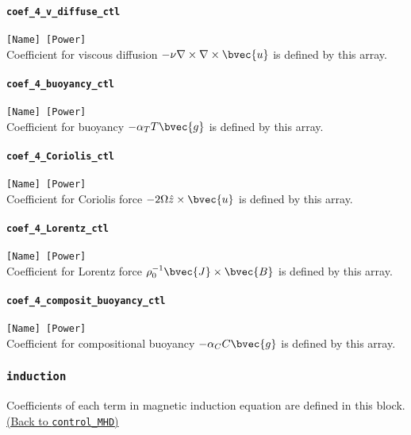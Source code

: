\paragraph{\tt coef\_4\_v\_diffuse\_ctl}
\label{href_t:coef_4_v_diffuse_ctl}
\verb|[Name] [Power]| \\
Coefficient for viscous diffusion $- \nu \nabla \times \nabla \times \bvec{u}$ is defined by this array.

\paragraph{\tt coef\_4\_buoyancy\_ctl}
\label{href_t:coef_4_buoyancy_ctl}
\verb|[Name] [Power]| \\
Coefficient for buoyancy $- \alpha_{T} T \bvec{g}$ is defined by this array.

\paragraph{\tt coef\_4\_Coriolis\_ctl}
\label{href_t:coef_4_Coriolis_ctl}
\verb|[Name] [Power]| \\
Coefficient for Coriolis force $-2 \Omega \hat{z} \times \bvec{u}$ is defined by this array.

\paragraph{\tt coef\_4\_Lorentz\_ctl}
\label{href_t:coef_4_Lorentz_ctl}
\verb|[Name] [Power]| \\
Coefficient for Lorentz force $ \rho_{0}^{-1} \bvec{J} \times \bvec{B}$ is defined by this array.

\paragraph{\tt coef\_4\_composit\_buoyancy\_ctl}
\label{href_t:coef_4_composit_buoyancy_ctl}
\verb|[Name] [Power]| \\
Coefficient for compositional buoyancy $ -\alpha_{C} C \bvec{g}$ is defined by this array.

\subsubsection{\tt induction}
\label{href_t:induction}
Coefficients of each term in magnetic induction equation are defined in this block. \\
\hyperref[href_i:induction]{(Back to {\tt control\_MHD})}

